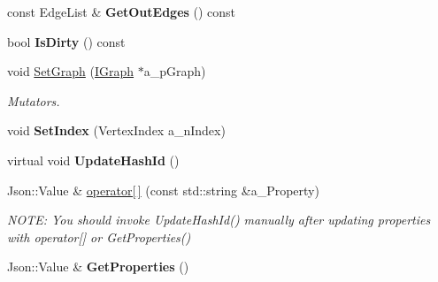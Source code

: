 \begin{DoxyCompactItemize}
\item 
\mbox{\label{class_i_graph_1_1_i_vertex_a9d435a11de3a4af4e88bbd7573ac5ce3}} 
const Edge\+List \& {\bfseries Get\+Out\+Edges} () const
\item 
\mbox{\label{class_i_graph_1_1_i_vertex_a373221f004432cebe4b85132e1443e3f}} 
bool {\bfseries Is\+Dirty} () const
\item 
\mbox{\label{class_i_graph_1_1_i_vertex_a7ac93c1a85e66f6d2f649e53a16d552e}} 
void \hyperlink{class_i_graph_1_1_i_vertex_a7ac93c1a85e66f6d2f649e53a16d552e}{Set\+Graph} (\hyperlink{class_i_graph}{I\+Graph} $\ast$a\+\_\+p\+Graph)
\begin{DoxyCompactList}\small\item\em Mutators. \end{DoxyCompactList}\item 
\mbox{\label{class_i_graph_1_1_i_vertex_acaf8a3b43c6daccbfbc3cc22d1bf1fc5}} 
void {\bfseries Set\+Index} (Vertex\+Index a\+\_\+n\+Index)
\item 
\mbox{\label{class_i_graph_1_1_i_vertex_a770219ef2fee791327d0cf783222d994}} 
virtual void {\bfseries Update\+Hash\+Id} ()
\item 
\mbox{\label{class_i_graph_1_1_i_vertex_af5096c350a78645a18b4f80d36e68043}} 
Json\+::\+Value \& \hyperlink{class_i_graph_1_1_i_vertex_af5096c350a78645a18b4f80d36e68043}{operator\mbox{[}$\,$\mbox{]}} (const std\+::string \&a\+\_\+\+Property)
\begin{DoxyCompactList}\small\item\em N\+O\+TE\+: You should invoke Update\+Hash\+Id() manually after updating properties with operator\mbox{[}\mbox{]} or Get\+Properties() \end{DoxyCompactList}\item 
\mbox{\label{class_i_graph_1_1_i_vertex_a1a17257e5b5767729cee582bd38f7f56}} 
Json\+::\+Value \& {\bfseries Get\+Properties} ()
\item 
\mbox{\label{class_i_graph_1_1_i_vertex_a5d96ab6b42f7baac3af2f7a8833a5c89}} 

\end{DoxyCompactItemize}
